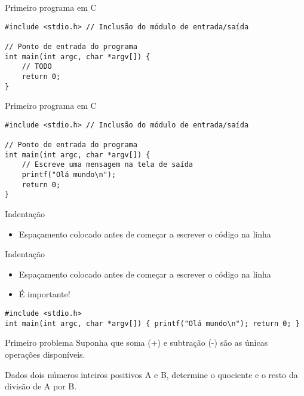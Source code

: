 \documentclass[t, aspectratio=169]{beamer}
\begin{document}
\begin{frame}[label={sec:orgcdd8b45},fragile]{Primeiro programa em C}
 \begin{verbatim}
#include <stdio.h> // Inclusão do módulo de entrada/saída

// Ponto de entrada do programa
int main(int argc, char *argv[]) {
    // TODO
    return 0;
}
\end{verbatim}
\end{frame}

\begin{frame}[label={sec:orgf98fe18},fragile]{Primeiro programa em C}
 \begin{verbatim}
#include <stdio.h> // Inclusão do módulo de entrada/saída

// Ponto de entrada do programa
int main(int argc, char *argv[]) {
    // Escreve uma mensagem na tela de saída
    printf("Olá mundo\n");
    return 0;
}
\end{verbatim}
\end{frame}

\begin{frame}[label={sec:org7b79493}]{Indentação}
\begin{itemize}
\item Espaçamento colocado antes de começar a escrever o código na linha
\end{itemize}
\end{frame}

\begin{frame}[label={sec:org0afce78},fragile]{Indentação}
 \begin{itemize}
\item Espaçamento colocado antes de começar a escrever o código na linha
\item É importante!
\end{itemize}

\begin{verbatim}
#include <stdio.h>
int main(int argc, char *argv[]) { printf("Olá mundo\n"); return 0; }
\end{verbatim}
\end{frame}

\begin{frame}[label={sec:orgd7758e3}]{Primeiro problema}
Suponha que soma (+) e subtração (-) são as únicas operações disponíveis.

Dados dois números inteiros positivos \alert{A} e \alert{B}, determine o \alert{quociente} e o \alert{resto}
da divisão de \alert{A} por \alert{B.}
\end{frame}
\end{document}
